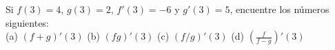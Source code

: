 \item Si $f(3) = 4$, $g(3) = 2$, $f'(3) = -6$ y $g'(3) = 5$, encuentre los números siguientes: \\
(a) $(f + g)'(3)$ \quad
(b) $(fg)'(3)$ \quad
(c) $(f/g)'(3)$ \quad
(d) $\displaystyle \left( \frac{f}{f - g} \right)'(3)$
